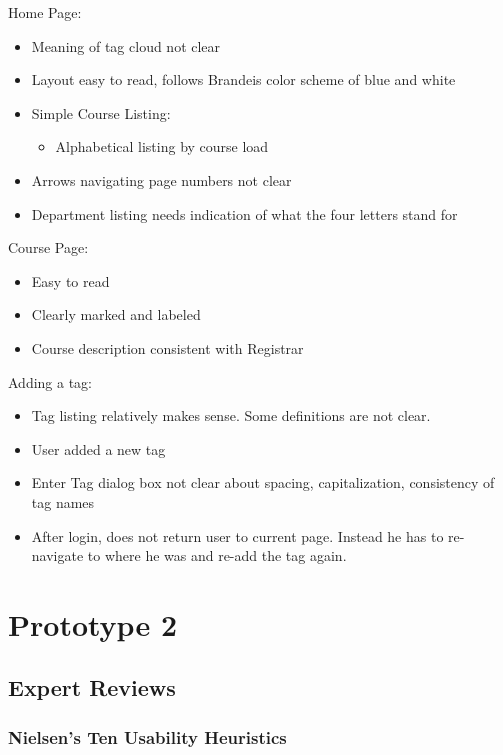 \documentclass[12pt]{report}
\begin{document}
Home Page:
\begin{itemize}
\item Meaning of tag cloud not clear
\item Layout easy to read, follows Brandeis color scheme of blue and white
\item Simple Course Listing: 
	\begin{itemize}
    \item Alphabetical listing by course load 
	\end{itemize}
\item Arrows navigating page numbers not clear
\item Department listing needs indication of what the four letters stand for 
\end{itemize}
Course Page:
\begin{itemize}
\item Easy to read
\item Clearly marked and labeled 
\item Course description consistent with Registrar 
\end{itemize}
Adding a tag:
\begin{itemize}
\item Tag listing relatively makes sense. Some definitions are not clear.
\item User added a new tag
\item Enter Tag dialog box not clear about spacing, capitalization, consistency of tag names
\item After login, does not return user to current page. Instead he has to re-navigate to where he was and re-add the tag again.
\end{itemize}


\chapter{Prototype 2}

\section{Expert Reviews}

\subsection{Nielsen’s Ten Usability Heuristics}
\end{document}
